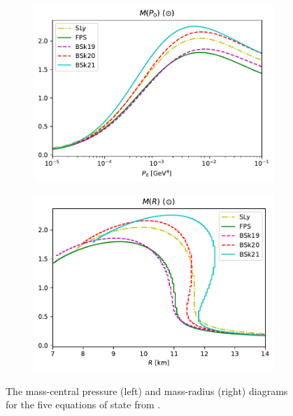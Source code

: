 \begin{figure}[h!]
    \centering
    \begin{subfigure}{.5\textwidth}
        \includegraphics[width=\textwidth]{images/tov/p0_analysis,all.pdf}
    \end{subfigure}%
    \begin{subfigure}{.5\textwidth}
        \includegraphics[width=\textwidth]{images/tov/r_analysis,all.pdf}
    \end{subfigure}
    \caption{The mass-central pressure (left) and mass-radius (right) diagrams for the five equations of state from \autocite{SLy_2004,BSk_2013}.}
    \label{fig: tov, all eos analyses}
\end{figure}


